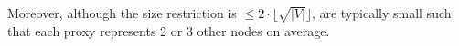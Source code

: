  Moreover, although the size restriction is $\le 2\cdot\lfloor\sqrt{|V|}\rfloor$, \dras are typically small such that each proxy represents 2 or 3 other nodes on average.


\begin{figure}[t!]
\begin{center}
\hspace{-4ex}
\hspace{-4ex}\vspace{-1.5ex}

\end{center}
\end{figure}
